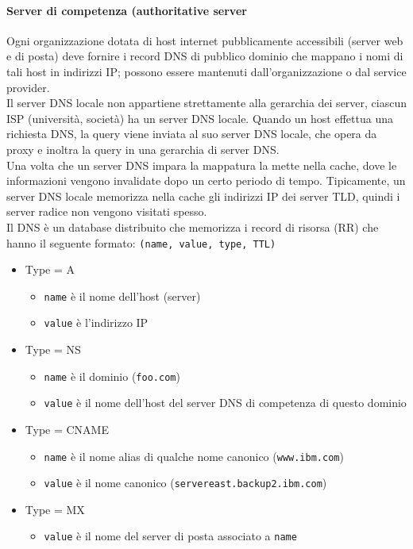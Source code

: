 \documentclass{report}
\newcommand{\code}{\texttt}
\begin{document}
	\paragraph{Server di competenza (authoritative server} Ogni organizzazione dotata di host internet pubblicamente accessibili (server web e di posta) deve fornire i record DNS di pubblico dominio che mappano i nomi di tali host in indirizzi IP; possono essere mantenuti dall'organizzazione o dal service provider.
	\medskip\\Il server DNS locale non appartiene strettamente alla gerarchia dei server, ciascun ISP (università, società) ha un server DNS locale. Quando un host effettua una richiesta DNS, la query viene inviata al suo server DNS locale, che opera da proxy e inoltra la query in una gerarchia di server DNS.
	\medskip\\Una volta che un server DNS impara la mappatura la mette nella cache, dove le informazioni vengono invalidate dopo un certo periodo di tempo. Tipicamente, un server DNS locale memorizza nella cache gli indirizzi IP dei server TLD, quindi i server radice non vengono visitati spesso.
	\medskip\\Il DNS è un database distribuito che memorizza i record di risorsa (RR) che hanno il seguente formato: \verb|(name, value, type, TTL)|
	\begin{itemize}
		\item Type = A
		\begin{itemize}
			\item \code{name} è il nome dell'host (server)
			\item \code{value} è l'indirizzo IP
		\end{itemize}
		\item Type = NS
		\begin{itemize}
			\item \code{name} è il dominio (\code{foo.com})
			\item \code{value} è il nome dell'host del server DNS di competenza di questo dominio
		\end{itemize}
		\item Type = CNAME
		\begin{itemize}
			\item \code{name} è il nome alias di qualche nome canonico (\code{www.ibm.com})
			\item \code{value} è il nome canonico (\code{servereast.backup2.ibm.com})
		\end{itemize}
		\item Type = MX
		\begin{itemize}
			\item \code{value} è il nome del server di posta associato a \code{name}
		\end{itemize}
	\end{itemize}
\end{document}
